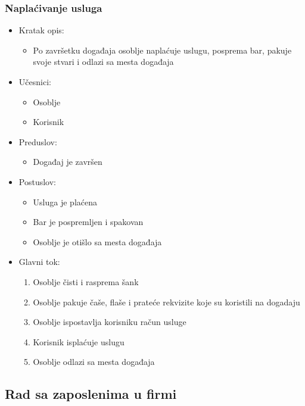 \documentclass[a4paper]{article}
\begin{document}
\subsubsection{Naplaćivanje usluga}

\begin{itemize}
    \item Kratak opis:
        \begin{itemize}
            \item Po završetku događaja osoblje naplaćuje uslugu, posprema bar, pakuje svoje stvari i odlazi sa mesta događaja
        \end{itemize}
    \item Učesnici:
        \begin{itemize}
            \item Osoblje
            \item Korisnik
        \end{itemize}
    \item Preduslov:
        \begin{itemize}
            \item Događaj je završen
        \end{itemize}
    \item Postuslov:
        \begin{itemize}
            \item Usluga je plaćena
		    \item Bar je pospremljen i spakovan
		    \item Osoblje je otišlo sa mesta događaja
        \end{itemize}
    \item Glavni tok:
        \begin{enumerate}
          \item Osoblje čisti i rasprema šank
		  \item Osoblje pakuje čaše, flaše i prateće rekvizite koje su koristili na dogadaju
		  \item Osoblje ispostavlja korisniku račun usluge
		  \item Korisnik isplaćuje uslugu
		  \item Osoblje odlazi sa mesta događaja
		  \end{enumerate}
    
\end{itemize}

\subsection{Rad sa zaposlenima u firmi}
\end{document}
